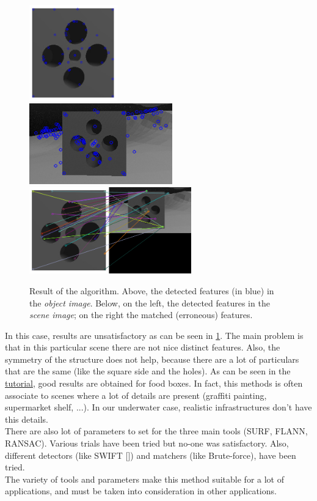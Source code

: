 \begin{figure}
	\centering
	\includegraphics[width=3.8cm]{new_featHomog_SURF_templKeyPoint}\\
	\vspace{15px}
	\includegraphics[width=6.2cm]{new_featHomog_SURF_cameraKeyPoint}
	\qquad
	\includegraphics[width=7cm]{new_featHomog_SURF_result}
	\caption{Result of the algorithm. Above, the detected features (in blue) in the \textit{object image}. Below, on the left, the detected features in the \textit{scene image}; on the right the matched (erroneous) features.}
	\label{fig:featHomog}
\end{figure}

In this case, results are unsatisfactory as can be seen in \ref{fig:featHomog}. The main problem is that in this particular scene there are not nice distinct features. Also, the symmetry of the structure does not help, because there are a lot of particulars that are the same (like the square side and the holes). As can be seen in the \href{https://docs.opencv.org/3.4/d7/dff/tutorial_feature_homography.html}{tutorial}, good results are obtained for food boxes. In fact, this methods is often associate to scenes where a lot of details are present (graffiti painting, supermarket shelf, ...). In our underwater case, realistic infrastructures don't have this details.\\
There are also lot of parameters to set for the three main tools (SURF, FLANN, RANSAC). Various trials have been tried but no-one was satisfactory. Also, different detectors (like SWIFT [\cite{loweTest}]) and matchers (like Brute-force), have been tried.\\
The variety of tools and parameters make this method suitable for a lot of applications, and must be taken into consideration in other applications.




